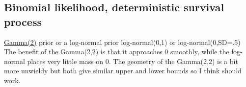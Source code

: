 \documentclass[12pt, oneside, titlepage]{article}   	%
\begin{document}




\subsection*{Binomial likelihood, deterministic survival process}

\href{https://discourse.mc-stan.org/t/funnel-transformed-to-unconstrained-space/8684/6}{Gamma(2)} prior 
or a log-normal prior log-normal(0,1) or log-normal(0,SD=.5) The benefit of the Gamma(2,2) is that it approaches 0 smoothly, while the log-normal places very little mass on 0. The geometry of the Gamma(2,2) is a bit more unwieldy but both give similar upper and lower bounds so I think should work.
\end{document}
